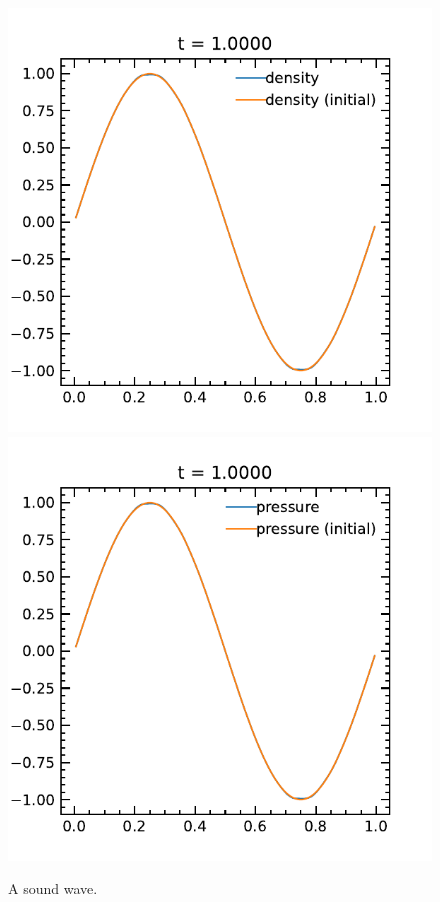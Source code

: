\documentclass[fleqn,usenatbib]{mnras}
\begin{document}
\begin{figure}
    \includegraphics[width=\columnwidth]{density_1.0000.pdf}
    \includegraphics[width=\columnwidth]{pressure_1.0000.pdf}
    \caption{A sound wave.}
    \label{fig:sound_wave}
\end{figure}
\end{document}
